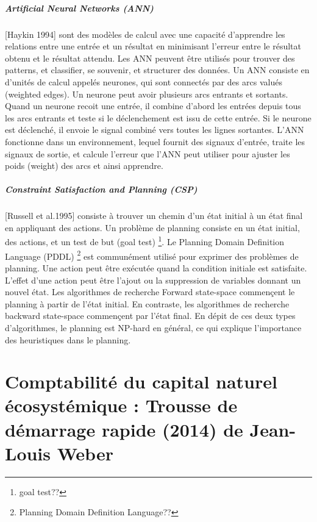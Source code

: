 \documentclass[11pt]{report}
\begin{document}
\subsubsection{Artificial Neural Networks (ANN)} [Haykin 1994] sont des modèles de calcul avec une capacité d'apprendre les relations entre une entrée et un résultat en minimisant l'erreur entre le résultat obtenu et le résultat attendu. Les ANN peuvent être utilisés pour trouver des patterns, et classifier, se souvenir, et structurer des données. Un ANN consiste en d'unités de calcul appelés neurones, qui sont connectés par des arcs valués (weighted edges). Un neurone peut avoir plusieurs arcs entrants et sortants. Quand un neurone recoit une entrée, il combine d'abord les entrées depuis tous les arcs entrants et teste si le déclenchement est issu de cette entrée. Si le neurone est déclenché, il envoie le signal combiné vers toutes les lignes sortantes. L'ANN fonctionne dans un environnement, lequel fournit des signaux d'entrée, traite les signaux de sortie, et calcule l'erreur que l'ANN peut utiliser pour ajuster les poids (weight) des arcs et ainsi apprendre.

\subsubsection{Constraint Satisfaction and Planning (CSP)}[Russell et al.1995] consiste à trouver un chemin d'un état initial à un état final en appliquant des actions. Un problème de planning consiste en un état initial, des actions, et un test de but (goal test) \footnote{goal test??}. Le Planning Domain Definition Language (PDDL) \footnote{Planning Domain Definition Language??} est communément utilisé pour exprimer des problèmes de planning. Une action peut être exécutée quand la  condition initiale est satisfaite. L'effet d'une action peut être l'ajout ou la suppression de variables donnant un nouvel état. Les algorithmes de recherche Forward state-space commençent le planning à partir de l'état initial. En contraste, les algorithmes de recherche backward state-space commençent par l'état final. En dépit de ces deux types d'algorithmes, le planning est NP-hard en général, ce qui explique l'importance des heuristiques dans le planning.  

\part{Comptabilité du capital naturel écosystémique : Trousse de démarrage rapide (2014) de Jean-Louis Weber}
\end{document}
